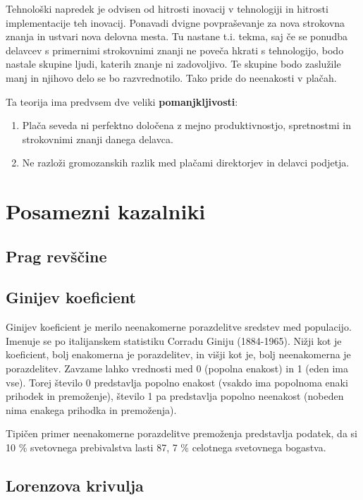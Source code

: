 \documentclass[a4paper,12 pt]{article}
\begin{document}
Tehnološki napredek je odvisen od hitrosti inovacij v tehnologiji in hitrosti implementacije teh inovacij. Ponavadi dvigne povpraševanje za nova strokovna znanja in ustvari nova delovna mesta. Tu nastane t.i. tekma, saj če se ponudba delavcev s primernimi strokovnimi znanji ne poveča hkrati s tehnologijo, bodo nastale skupine ljudi, katerih znanje ni zadovoljivo. Te skupine bodo zaslužile manj in njihovo delo se bo razvrednotilo. Tako pride do neenakosti v plačah.


Ta teorija ima predvsem dve veliki \textbf{pomanjkljivosti}:
\begin{enumerate}
\item Plača seveda ni perfektno določena z mejno produktivnostjo, spretnostmi in strokovnimi znanji danega delavca.
\item Ne razloži gromozanskih razlik med plačami direktorjev in delavci podjetja.
\end{enumerate}


\newpage

\section[Posamezni kazalniki]{Posamezni kazalniki}
\subsection[Prag revščine]{Prag revščine}

\subsection[Ginijev koeficient]{Ginijev koeficient}
Ginijev koeficient je merilo neenakomerne porazdelitve sredstev med populacijo. Imenuje se po italijanskem statistiku Corradu Giniju (1884-1965). Nižji kot je koeficient,  bolj enakomerna je porazdelitev,  in višji kot je,  bolj neenakomerna je porazdelitev. Zavzame lahko vrednosti med 0 (popolna enakost) in 1 (eden ima vse). Torej število 0 predstavlja popolno enakost (vsakdo ima popolnoma enaki prihodek in premoženje), število 1 pa predstavlja popolno neenakost (nobeden nima enakega prihodka in premoženja). 

Tipičen primer neenakomerne porazdelitve premoženja predstavlja podatek, da si 10 \% svetovnega prebivalstva lasti 87, 7 \% celotnega svetovnega bogastva.

\subsection[Lorenzova krivulja]{Lorenzova krivulja}
\end{document}

